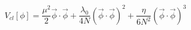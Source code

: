 \begin{equation}
V_{cl}[\phi] = \frac{\mu^2}{2} \vec \phi \cdot \vec \phi + \frac
{\lambda_0}{4
N} (\vec \phi \cdot \vec \phi)^2 + \frac{\eta}{6 N^2} (\vec \phi \cdot \vec
\phi)^3
 \end{equation}

